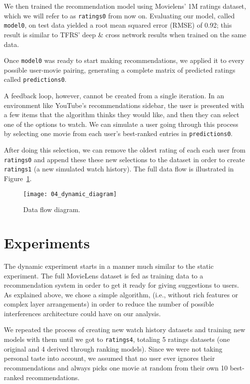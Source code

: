 We then trained the recommendation model using Movielens' 1M ratings dataset,
which we will refer to as \verb|ratings0| from now on. Evaluating our model,
called \verb|model0|, on test data yielded a root mean squared error (RMSE) of
0.92; this result is similar to TFRS' deep \& cross network
\citep{wang_deep_2017} results when trained on the same data.

Once \verb|model0| was ready to start making recommendations, we applied it to
every possible user-movie pairing, generating a complete matrix of predicted
ratings called \verb|predictions0|.

A feedback loop, however, cannot be created from a single iteration. In an
environment like YouTube's recommendations sidebar, the user is presented with a
few items that the algorithm thinks they would like, and then they can select
one of the options to watch. We can simulate a user going through this process
by selecting one movie from each user's best-ranked entries in
\verb|predictions0|.

After doing this selection, we can remove the oldest rating of each each user
from \verb|ratings0| and append these these new selections to the dataset in
order to create \verb|ratings1| (a new simulated watch history). The full data
flow is illustrated in Figure~\ref{fig:fig04_dynamic_diagram}.

\begin{figure}
  \centering
  \texttt{[image: 04\_dynamic\_diagram]}
  \caption{Data flow diagram.\label{fig:fig04_dynamic_diagram}}
\end{figure}

\section{Experiments}
\label{sec:experiments04}

The dynamic experiment starts in a manner much similar to the static experiment.
The full MovieLens dataset is fed as training data to a recommendation system in
order to get it ready for giving suggestions to users. As explained above, we
chose a simple algorithm, (i.e., without rich features or complex layer
arrangements) in order to reduce the number of possible interferences
architecture could have on our analysis.

We repeated the process of creating new watch history datasets and training new
models with them until we got to \verb|ratings4|, totaling 5 ratings datasets
(one original and 4 derived through ranking models). Since we were not taking
personal taste into account, we assumed that no user ever ignores their
recommendations and always picks one movie at random from their own 10
best-ranked recommendations.

